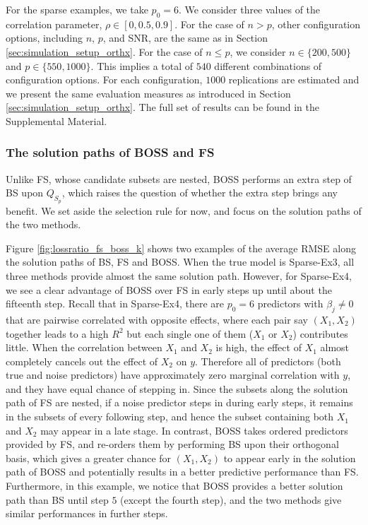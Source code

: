 For the sparse examples, we take $p_0=6$. We consider three values of the correlation parameter, $\rho \in [0, 0.5, 0.9]$. For the case of $n>p$, other configuration options, including $n$, $p$, and SNR, are the same as in Section \ref{sec:simulation_setup_orthx}. For the case of $n \le p$, we consider $n \in \{200, 500\}$ and $p \in \{550, 1000\}$. This implies a total of $540$ different combinations of configuration options. For each configuration, $1000$ replications are estimated and we present the same evaluation measures as introduced in Section \ref{sec:simulation_setup_orthx}. The full set of results can be found in the Supplemental Material.


\subsubsection{The solution paths of BOSS and FS}
Unlike FS, whose candidate subsets are nested, BOSS performs an extra step of BS upon $Q_{S_p}$, which raises the question of whether the extra step brings any benefit. We set aside the selection rule for now, and focus on the solution paths of the two methods. 

Figure \ref{fig:lossratio_fs_boss_k} shows two examples of the average RMSE along the solution paths of BS, FS and BOSS. When the true model is Sparse-Ex3, all three methods provide almost the same solution path. However, for Sparse-Ex4, we see a clear advantage of BOSS over FS in early steps up until about the fifteenth step. Recall that in Sparse-Ex4, there are $p_0=6$ predictors with $\beta_j \ne 0$ that are pairwise correlated with opposite effects, where each pair say $(X_1,X_2)$ together leads to a high $R^2$ but each single one of them ($X_1$ or $X_2$) contributes little. When the correlation between $X_1$ and $X_2$ is high, the effect of $X_1$ almost completely cancels out the effect of $X_2$ on $y$. Therefore all of predictors (both true and noise predictors) have approximately zero marginal correlation with $y$, and they have equal chance of stepping in. Since the subsets along the solution path of FS are nested, if a noise predictor steps in during early steps, it remains in the subsets of every following step, and hence the subset containing both $X_1$ and $X_2$ may appear in a late stage. In contrast, BOSS takes ordered predictors provided by FS, and re-orders them by performing BS upon their orthogonal basis, which gives a greater chance for $(X_1,X_2)$ to appear early in the solution path of BOSS and potentially results in a better predictive performance than FS. Furthermore, in this example, we notice that BOSS provides a better solution path than BS until step $5$ (except the fourth step), and the two methods give similar performances in further steps.


